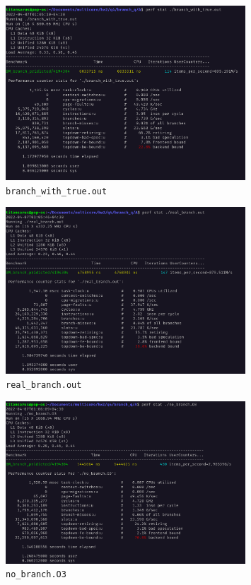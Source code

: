 \documentclass[12pt]{article}
\begin{document}
\begin{itemize}
\begin{figure}[H]
	\centering
	\includegraphics[width=0.8\textwidth]{./images/4A/branch-with-true.png}	
	\cprotect\caption{\Verb+branch_with_true.out+}
\end{figure}

\begin{figure}[H]
	\centering
	\includegraphics[width=0.8\textwidth]{./images/4A/real-branch.png}	
	\cprotect\caption{\Verb+real_branch.out+}
\end{figure}

\begin{figure}[H]
	\centering
	\includegraphics[width=0.8\textwidth]{./images/4A/no-branch-o3.png}	
	\cprotect\caption{\Verb+no_branch.O3+}
\end{figure}
			


\end{itemize}
\end{document}
